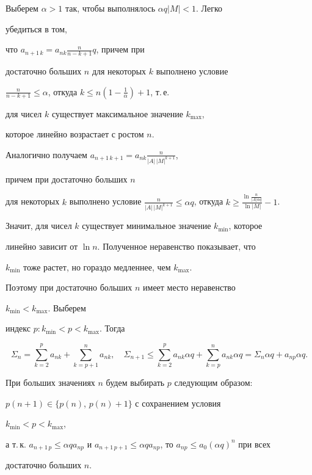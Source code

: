 Выберем $\alpha>1$ так, чтобы выполнялось $\alpha q|M|<1$. Легко 


убедиться в том, 


что $a_{n+1\,k}=a_{nk}\frac{n}{n-k+1}q$, причем при 


достаточно больших $n$ для некоторых $k$ выполнено условие 


$\frac{n}{n-k+1}\le\alpha$, откуда $k\le n(1-\frac{1}{\alpha})+1$, т.\,е. 


для чисел $k$ существует максимальное значение $k_{\max}$, 


которое линейно возрастает с ростом $n$. 


Аналогично получаем $a_{n+1\,k+1}=a_{nk}\frac{n}{|A|\,|M|^{k+1}}$, 


причем при достаточно больших $n$ 


для некоторых $k$ выполнено условие $\frac{n}{|A|\,|M|^{k+1}}\le\alpha 


q$, откуда $k\ge\frac{\ln\frac{n}{|A|\alpha q}}{\ln|M|}-1$. 


Значит, для чисел $k$ существует минимальное значение $k_{\min}$, которое 


линейно зависит от $\ln n$. Полученное неравенство показывает, что 


$k_{\min}$ тоже растет, но гораздо медленнее, чем $k_{\max}$. 


Поэтому при достаточно больших $n$ имеет место неравенство 


$k_{\min}<k_{\max}$. Выберем 


индекс $p:k_{\min}<p<k_{\max}$. Тогда 


$$ 


\Sigma_n=\sum^p_{k=2}a_{nk}+\sum^n_{k=p+1}a_{nk},\quad 


\Sigma_{n+1}\le\sum^p_{k=2}a_{nk}\alpha q+ 


\sum^n_{k=p}a_{nk}\alpha q=\Sigma_n\alpha q+ 


a_{np}\alpha q. 


$$ 


При больших значениях $n$ будем выбирать $p$ следующим образом: 


$p(n+1)\in\{p(n)$, $p(n)+1\}$ с сохранением условия 


$k_{\min}<p<k_{\max}$, 


а т.\,к. $a_{n+1\,p}\le\alpha q a_{np}$ и $a_{n+1\,p+1}\le \alpha q 


a_{np}$, то $a_{np}\le a_0(\alpha q)^n$ при всех 


достаточно больших $n$. 


